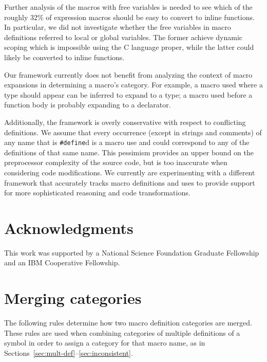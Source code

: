 \documentclass[10pt]{article}
\begin{document}
Further analysis of the macros with free variables is needed to see which
of the roughly 32\% of expression macros should be easy to convert to
inline functions.  In particular, we did not investigate whether the free
variables in macro definitions referred to local or global variables.  The
former achieve dynamic scoping which is impossible using the C language
proper, while the latter could likely be converted to inline functions.

Our framework currently does not benefit from analyzing the context of
macro expansions in determining a macro's category.  For example, a
macro used where a type should appear can be inferred to expand to a
type; a macro used before a function body is probably expanding to a
declarator.

Additionally, the framework is overly conservative with respect to
conflicting definitions.  We assume that every occurrence (except in
strings and comments) of any name that is \texttt{\#define}d is a macro
use and could correspond to any of the definitions of that same name.
This pessimism provides an upper bound on the preprocessor complexity of
the source code, but is too inaccurate when considering code
modifications.  We currently are experimenting with a different
framework that accurately tracks macro definitions and uses to provide
support for more sophisticated reasoning and code transformations.

\section*{Acknowledgments}

This work was supported by a National Science Foundation Graduate
Fellowship and an IBM Cooperative Fellowship.
    


{\small }


\appendix

\section{Merging categories}
\label{app:category-lub}

The following rules determine how two macro definition categories are
merged.  These rules are used when combining categories of multiple
definitions of a symbol in order to assign a category for that macro name,
as in Sections~\ref{sec:mult-def}--\ref{sec:inconsistent}.
\end{document}
